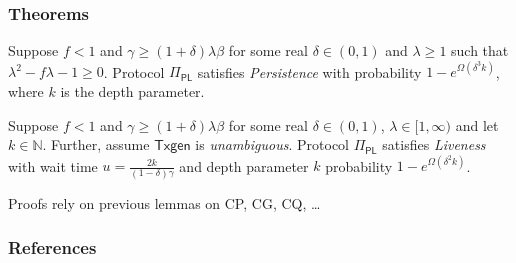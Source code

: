 \documentclass{beamer}
\begin{document}
\begin{frame}
\frametitle{Theorems}

\begin{theorem}[Persistence]
    Suppose $f < 1$ and $\gamma \geq (1 + \delta)\lambda \beta$ for some real $\delta \in (0,1)$ and $\lambda \geq 1$ such that $\lambda^2 - f\lambda - 1 \geq 0$.
    Protocol $\Pi_{\mathsf{PL}}$ satisfies \emph{Persistence} with probability $1 - e^{\Omega(\delta^3k)}$, where $k$ is the depth parameter.
\end{theorem}

\begin{theorem}[Liveness]
    Suppose $f < 1$ and $\gamma \geq (1 + \delta)\lambda \beta$ for some real $\delta \in (0,1)$, $\lambda \in [1, \infty)$ and let $k \in \mathbb{N}$.
    Further, assume $\mathsf{Txgen}$ is \emph{unambiguous}.
    Protocol $\Pi_{\mathsf{PL}}$ satisfies \emph{Liveness} with wait time $u = \frac{2k}{(1-\delta)\gamma}$ and depth parameter $k$ probability $1 - e^{\Omega(\delta^2k)}$.
\end{theorem}

Proofs rely on previous lemmas on CP, CG, CQ, \dots

\end{frame}


\begin{frame}[allowframebreaks]
    \frametitle{References}
    
    \tiny
\end{frame}
\end{document}

